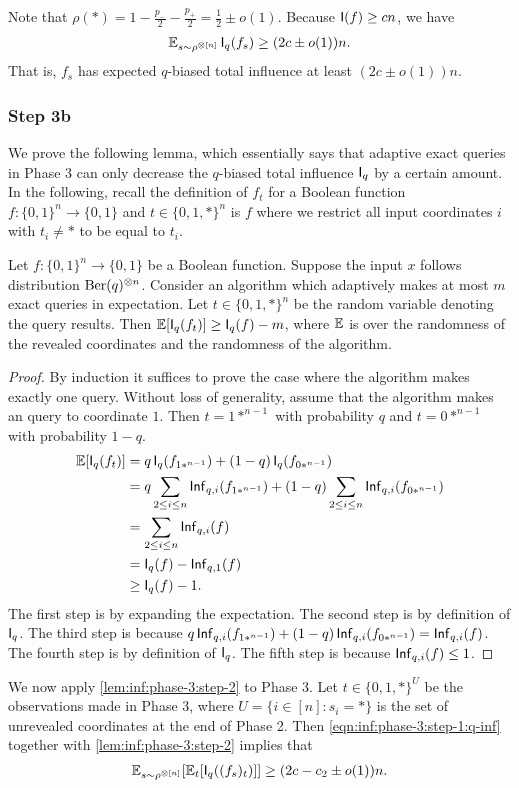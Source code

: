 Note that $\rho(*) = 1-\frac{p_-}2-\frac{p_+}2 = \frac12 \pm o(1)$.
Because $\operatorname{\mathsf{I}}(f) \ge c n$, we have
\begin{align} \label{eqn:inf:phase-3:step-1:q-inf}
  \mathbb{E}_{s\sim \rho^{\otimes [n]}} \operatorname{\mathsf{I}}_q(f_s) \ge (2c\pm o(1)) n.
\end{align}
That is, $f_s$ has expected $q$-biased total influence at least $(2c\pm o(1)) n$.

\subsubsection{Step 3b}
We prove the following lemma, which essentially says that adaptive exact queries in Phase 3 can only decrease the $q$-biased total influence $\operatorname{\mathsf{I}}_q$ by a certain amount. In the following, recall the definition of $f_t$ for a Boolean function $f: \{0,1\}^n\to \{0,1\}$ and $t\in \{0,1,*\}^n$ is $f$ where we restrict all input coordinates $i$ with $t_i \ne *$ to be equal to $t_i$.

\begin{lemma} \label{lem:inf:phase-3:step-2}
  Let $f: \{0,1\}^n\to \{0,1\}$ be a Boolean function.
  Suppose the input $x$ follows distribution $\operatorname{\mathrm{Ber}}(q)^{\otimes n}$.
  Consider an algorithm which adaptively makes at most $m$ exact queries in expectation.
  Let $t\in \{0,1,*\}^n$ be the random variable denoting the query results.
  Then $\mathbb{E}[\operatorname{\mathsf{I}}_q(f_t)] \ge \operatorname{\mathsf{I}}_q(f)-m$, where $\mathbb{E}$ is over the randomness of the revealed coordinates and the randomness of the algorithm.
\end{lemma}
\begin{proof}
  By induction it suffices to prove the case where the algorithm makes exactly one query.
  Without loss of generality, assume that the algorithm makes an query to coordinate $1$.
  Then $t=1*^{n-1}$ with probability $q$ and $t=0*^{n-1}$ with probability $1-q$.
  \begin{align*}
    \mathbb{E}[\operatorname{\mathsf{I}}_q(f_t)] &= q \operatorname{\mathsf{I}}_q(f_{1*^{n-1}}) + (1-q) \operatorname{\mathsf{I}}_q(f_{0*^{n-1}}) \\
    &= q \sum_{2\le i\le n} \operatorname{\mathsf{Inf}}_{q,i}(f_{1*^{n-1}}) +(1-q) \sum_{2\le i\le n} \operatorname{\mathsf{Inf}}_{q,i}(f_{0*^{n-1}}) \\
    &= \sum_{2\le i\le n} \operatorname{\mathsf{Inf}}_{q,i}(f) \\
    &= \operatorname{\mathsf{I}}_q(f) - \operatorname{\mathsf{Inf}}_{q,1}(f) \\
    &\ge \operatorname{\mathsf{I}}_q(f)-1.
  \end{align*}
  The first step is by expanding the expectation.
  The second step is by definition of $\operatorname{\mathsf{I}}_q$.
  The third step is because $q \operatorname{\mathsf{Inf}}_{q,i}(f_{1*^{n-1}}) + (1-q) \operatorname{\mathsf{Inf}}_{q,i}(f_{0*^{n-1}}) = \operatorname{\mathsf{Inf}}_{q,i}(f)$.
  The fourth step is by definition of $\operatorname{\mathsf{I}}_q$.
  The fifth step is because $\operatorname{\mathsf{Inf}}_{q,i}(f) \le 1$.
\end{proof}
We now apply \cref{lem:inf:phase-3:step-2} to Phase 3. Let $t\in \{0,1,*\}^U$ be the observations made in Phase 3, where $U = \{i\in [n]: s_i=*\}$ is the set of unrevealed coordinates at the end of Phase 2.
Then \cref{eqn:inf:phase-3:step-1:q-inf} together with \cref{lem:inf:phase-3:step-2} implies that
\begin{align} \label{eqn:inf:phase-3:step-2:q-inf}
  \mathbb{E}_{s\sim \rho^{\otimes [n]}} [ \mathbb{E}_t [\operatorname{\mathsf{I}}_q((f_{s})_{t})] ]\ge (2c - c_2\pm o(1)) n.
\end{align}

